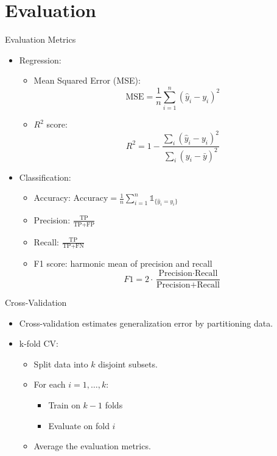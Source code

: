 \documentclass[aspectratio=169]{beamer}
\begin{document}
\section{Evaluation}
\label{sec:org2060ddc}
\begin{frame}[label={sec:orgd7f121d}]{Evaluation Metrics}
\begin{itemize}
\item \alert{Regression}:
\begin{itemize}
\item Mean Squared Error (MSE): 
\[
    \text{MSE} = \frac{1}{n} \sum_{i=1}^n (\hat{y}_i - y_i)^2
    \]
\item \(R^2\) score:
\[
    R^2 = 1 - \frac{\sum_i (\hat{y}_i - y_i)^2}{\sum_i (y_i - \bar{y})^2}
    \]
\end{itemize}

\item \alert{Classification}:
\begin{itemize}
\item Accuracy: \(\text{Accuracy} = \frac{1}{n} \sum_{i=1}^n \mathds{1}_{\{\hat{y}_i = y_i\}}\)
\item Precision: \(\frac{\text{TP}}{\text{TP} + \text{FP}}\)
\item Recall: \(\frac{\text{TP}}{\text{TP} + \text{FN}}\)
\item F1 score: harmonic mean of precision and recall
\[
    F1 = 2 \cdot \frac{\text{Precision} \cdot \text{Recall}}{\text{Precision} + \text{Recall}}
    \]
\end{itemize}
\end{itemize}
\end{frame}

\begin{frame}[label={sec:orgcaca220}]{Cross-Validation}
\begin{itemize}
\item Cross-validation estimates generalization error by partitioning data.
\item \alert{k-fold CV}:
\begin{itemize}
\item Split data into \(k\) disjoint subsets.
\item For each \(i = 1, \ldots, k\):
\begin{itemize}
\item Train on \(k-1\) folds
\item Evaluate on fold \(i\)
\end{itemize}
\item Average the evaluation metrics.
\end{itemize}
\end{itemize}
\end{frame}
\end{document}
